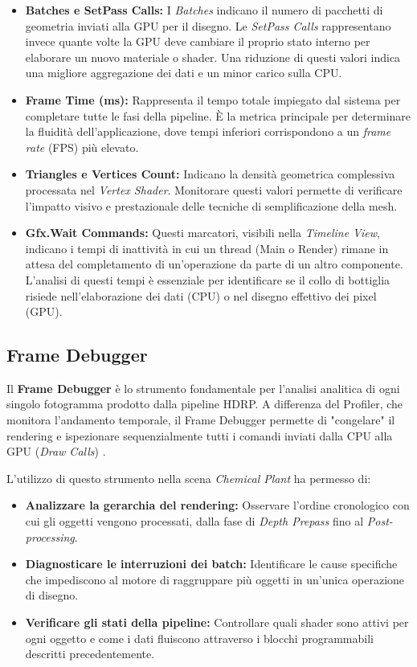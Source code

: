 \begin{itemize}
    \item \textbf{Batches e SetPass Calls:} I \textit{Batches} indicano il numero di pacchetti di geometria inviati alla GPU per il disegno. Le \textit{SetPass Calls} rappresentano invece quante volte la GPU deve cambiare il proprio stato interno per elaborare un nuovo materiale o shader. Una riduzione di questi valori indica una migliore aggregazione dei dati e un minor carico sulla CPU.
    
    \item \textbf{Frame Time (ms):} Rappresenta il tempo totale impiegato dal sistema per completare tutte le fasi della pipeline. È la metrica principale per determinare la fluidità dell'applicazione, dove tempi inferiori corrispondono a un \textit{frame rate} (FPS) più elevato.
    
    \item \textbf{Triangles e Vertices Count:} Indicano la densità geometrica complessiva processata nel \textit{Vertex Shader}. Monitorare questi valori permette di verificare l'impatto visivo e prestazionale delle tecniche di semplificazione della mesh.
    
    \item \textbf{Gfx.Wait Commands:} Questi marcatori, visibili nella \textit{Timeline View}, indicano i tempi di inattività in cui un thread (Main o Render) rimane in attesa del completamento di un'operazione da parte di un altro componente. L'analisi di questi tempi è essenziale per identificare se il collo di bottiglia risiede nell'elaborazione dei dati (CPU) o nel disegno effettivo dei pixel (GPU).
\end{itemize}

\subsection{Frame Debugger}

Il \textbf{Frame Debugger} è lo strumento fondamentale per l'analisi analitica di ogni singolo fotogramma prodotto dalla pipeline HDRP. A differenza del Profiler, che monitora l'andamento temporale, il Frame Debugger permette di "congelare" il rendering e ispezionare sequenzialmente tutti i comandi inviati dalla CPU alla GPU (\textit{Draw Calls}) \cite{UnityFrameDebugger}.

L'utilizzo di questo strumento nella scena \textit{Chemical Plant} ha permesso di:
\begin{itemize}
    \item \textbf{Analizzare la gerarchia del rendering:} Osservare l'ordine cronologico con cui gli oggetti vengono processati, dalla fase di \textit{Depth Prepass} fino al \textit{Post-processing}.
    \item \textbf{Diagnosticare le interruzioni dei batch:} Identificare le cause specifiche che impediscono al motore di raggruppare più oggetti in un'unica operazione di disegno.
    \item \textbf{Verificare gli stati della pipeline:} Controllare quali shader sono attivi per ogni oggetto e come i dati fluiscono attraverso i blocchi programmabili descritti precedentemente.
\end{itemize}

